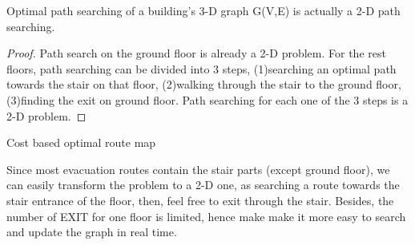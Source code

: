 \documentclass[conference]{IEEEtran}
\begin{document}
    \begin{lemma}
    Optimal path searching of a building's 3-D graph G(V,E) is actually a 2-D path searching.
    \end{lemma}

    \begin{proof}[Proof]
      Path search on the ground floor is already a 2-D problem. For the rest floors, path searching can be divided into 3 steps, (1)searching an optimal path towards the stair on that floor, (2)walking through the stair to the ground floor, (3)finding the exit on ground floor. Path searching for each one of the 3 steps is a 2-D problem.
    \end{proof} 
    \begin{algorithm}[!t]
      \label{alg:optRoute}
      \DontPrintSemicolon
      \caption{Cost based optimal route map}
    \end{algorithm}

    Since most evacuation routes contain the stair parts (except ground floor), we can easily transform the problem to a 2-D one, as searching a route towards the stair entrance of the floor, then, feel free to exit through the stair. Besides, the number of EXIT for one floor is limited, hence make make it more easy to search and update the graph in real time. 
\end{document}
